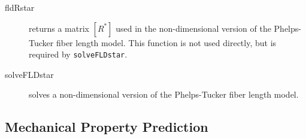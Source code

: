 \documentclass[11pt]{article}
\begin{document}
\begin{description}

    \item[fldRstar]{returns a matrix $[R^*]$ used in the non-dimensional version of the Phelps-Tucker fiber length model.  This function is not used directly, but is required by \texttt{solveFLDstar}.}
    
    \item[solveFLDstar]{solves a non-dimensional version of the Phelps-Tucker fiber length model.}
    
\end{description}

\subsection{Mechanical Property Prediction}
\end{document}
